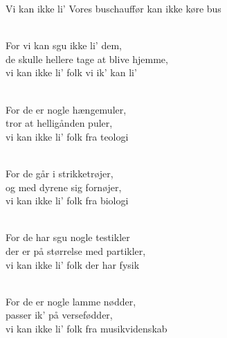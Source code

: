 \begin{song}{Vi kan ikke li'}
  {} %
  {Vores buschauffør kan ikke køre bus} %
  {} %
  {} %
  {\NotCCLIed} %

 \begin{SBVerse}
    \\
    For vi kan sgu ikke li' dem,\\
    de skulle hellere tage at blive hjemme,\\
    vi kan ikke li' folk vi ik' kan li'
  \end{SBVerse}

  \begin{SBVerse}
    \\
    For de er nogle hængemuler,\\
    tror at helligånden puler,\\
    vi kan ikke li' folk fra teologi
  \end{SBVerse}

  \begin{SBVerse}
    \\
    For de går i strikketrøjer,\\
    og med dyrene sig fornøjer,\\
    vi kan ikke li' folk fra biologi
  \end{SBVerse}

  \begin{SBVerse}
    \\
    For de har sgu nogle testikler\\
    der er på størrelse med partikler,\\
    vi kan ikke li' folk der har fysik
  \end{SBVerse}

  \begin{SBVerse}
    \\
    For de er nogle lamme nødder,\\
    passer ik' på versefødder,\\
    vi kan ikke li' folk fra musikvidenskab
  \end{SBVerse}


\end{song}
